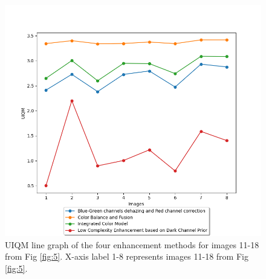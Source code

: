 \documentclass[a4paper,11pt,oneside]{article}
\begin{document}
  \begin{figure}[H]
  \begin{center}
  \includegraphics[width=\linewidth]{line_graph_UIQM_1.png}
  \end{center}
  \caption{UIQM line graph of the four enhancement methods for images 11-18 from Fig \ref{fig:5}.  X-axis label 1-8 represents images 11-18 from Fig \ref{fig:5}.}
  \label{fig:11}
  \end{figure}
  
\end{document}

